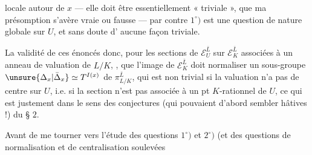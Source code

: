 locale autour de $x$ --- elle doit être essentiellement « triviale », que ma présomption s'avère vraie ou fausse --- par contre $1^\circ)$ est une question de nature globale sur $U$, et sans doute d' aucune façon triviale.

 La validité de ces énoncés   donc, pour les sections de $\mathcal E_U^{\bar L}$ sur $\mathcal E_K^{\bar L}$ associées à un anneau de valuation de $L/K$, , que l'image de $\mathcal E_K^{\bar L}$ doit normaliser un  sous-groupe $\unsure{\Delta_x|\bar\Delta_x}\simeq T^{I(x)}$ de $\pi_{L/K}^{\bar L}$, qui est non trivial si la valuation n'a pas de centre sur $U$, i.e. si la section n'est pas associée à un pt $K$-rationnel de $U$, ce qui est justement dans le sens des conjectures (qui pouvaient d'abord sembler hâtives !) du § $2$.

Avant de me tourner vers l'étude des questions $1^\circ)$ et $2^\circ)$ (et  des questions de normalisation et de centralisation soulevées
